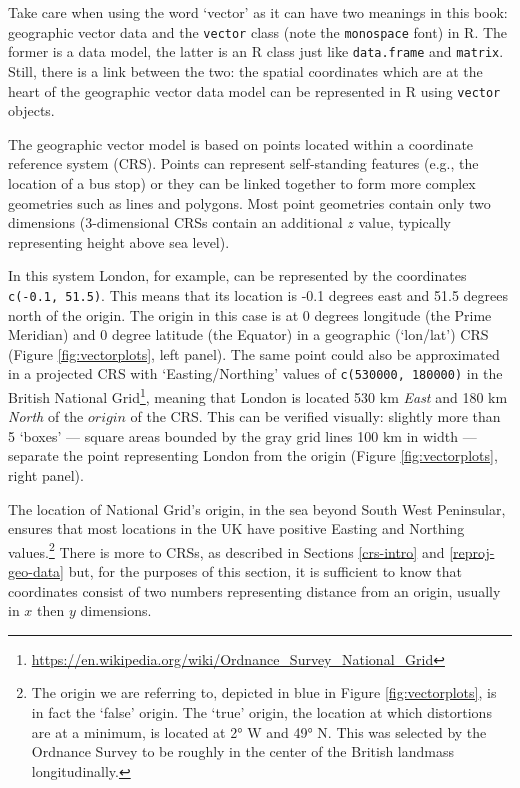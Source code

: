 \documentclass[]{krantz}
\let\rmarkdownfootnote\footnote%
\def\footnote{\protect\rmarkdownfootnote}
\renewcommand{\href}[2]{#2\footnote{\url{#1}}}
\let\BeginKnitrBlock\begin \let\EndKnitrBlock\end
\begin{document}
\BeginKnitrBlock{rmdnote}
Take care when using the word `vector' as it can have two meanings in this book:
geographic vector data and the \texttt{vector} class (note the \texttt{monospace} font) in R.
The former is a data model, the latter is an R class just like \texttt{data.frame} and \texttt{matrix}.
Still, there is a link between the two: the spatial coordinates which are at the heart of the geographic vector data model can be represented in R using \texttt{vector} objects.
\EndKnitrBlock{rmdnote}

The geographic vector model is based on points located within a coordinate reference system (CRS).
Points can represent self-standing features (e.g., the location of a bus stop) or they can be linked together to form more complex geometries such as lines and polygons.
Most point geometries contain only two dimensions (3-dimensional CRSs contain an additional \(z\) value, typically representing height above sea level).

In this system London, for example, can be represented by the coordinates \texttt{c(-0.1,\ 51.5)}.
This means that its location is -0.1 degrees east and 51.5 degrees north of the origin.
The origin in this case is at 0 degrees longitude (the Prime Meridian) and 0 degree latitude (the Equator) in a geographic (`lon/lat') CRS (Figure \ref{fig:vectorplots}, left panel).
The same point could also be approximated in a projected CRS with `Easting/Northing' values of \texttt{c(530000,\ 180000)} in the \href{https://en.wikipedia.org/wiki/Ordnance_Survey_National_Grid}{British National Grid}, meaning that London is located 530 km \emph{East} and 180 km \emph{North} of the \(origin\) of the CRS.
This can be verified visually: slightly more than 5 `boxes' --- square areas bounded by the gray grid lines 100 km in width --- separate the point representing London from the origin (Figure \ref{fig:vectorplots}, right panel).

The location of National Grid's origin, in the sea beyond South West Peninsular, ensures that most locations in the UK have positive Easting and Northing values.\footnote{The origin we are referring to, depicted in blue in Figure \ref{fig:vectorplots}, is in fact the `false' origin.
  The `true' origin, the location at which distortions are at a minimum, is located at 2° W and 49° N.
  This was selected by the Ordnance Survey to be roughly in the center of the British landmass longitudinally.}
There is more to CRSs, as described in Sections \ref{crs-intro} and \ref{reproj-geo-data} but, for the purposes of this section, it is sufficient to know that coordinates consist of two numbers representing distance from an origin, usually in \(x\) then \(y\) dimensions.
\end{document}
